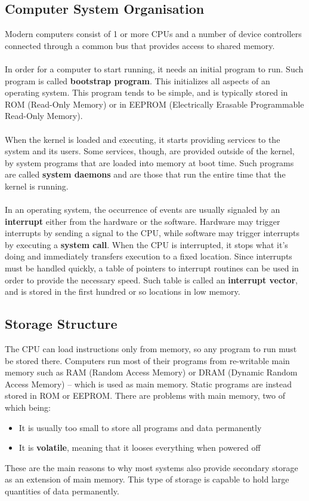 \documentclass{article}
\begin{document}
\subsection{Computer System Organisation}
Modern computers consist of 1 or more CPUs and a number of device controllers connected through a common bus that provides access to shared memory. \\ \\
In order for a computer to start running, it needs an initial program to run. Such program is called \textbf{bootstrap program}. This initializes all aspects of an operating system. This program tends to be simple, and is typically stored in ROM (Read-Only Memory) or in EEPROM (Electrically Erasable Programmable Read-Only Memory).\\ \\
When the kernel is loaded and executing, it starts providing services to the system and its users. Some services, though, are provided outside of the kernel, by system programs that are loaded into memory at boot time. Such programs are called \textbf{system daemons} and are those that run the entire time that the kernel is running.\\ \\
In an operating system, the occurrence of events are usually signaled by an \textbf{interrupt} either from the hardware or the software. Hardware may trigger interrupts by sending a signal to the CPU, while software may trigger interrupts by executing a \textbf{system call}. When the CPU is interrupted, it stops what it's doing and immediately transfers execution to a fixed location. Since interrupts must be handled quickly, a table of pointers to interrupt routines can be used in order to provide the necessary speed. Such table is called an \textbf{interrupt vector}, and is stored in the first hundred or so locations in low memory.

\subsection{Storage Structure}
The CPU can load instructions only from memory, so any program to run must be stored there. Computers run most of their programs from re-writable main memory such as RAM (Random Access Memory) or DRAM (Dynamic Random Access Memory) -- which is used as main memory. Static programs are instead stored in ROM or EEPROM. There are problems with main memory, two of which being:

\begin{itemize}
	\item It is usually too small to store all programs and data permanently
	\item It is \textbf{volatile}, meaning that it looses everything when powered off
\end{itemize}
These are the main reasons to why most systems also provide secondary storage as an extension of main memory. This type of storage is capable to hold large quantities of data permanently.
\end{document}
